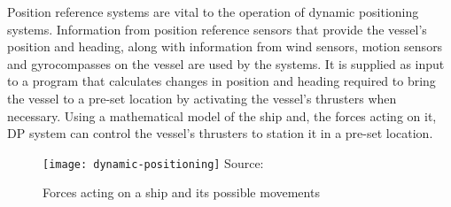

Position reference systems are vital to the operation of dynamic positioning systems. Information from position reference sensors that provide the vessel’s position and heading, along with information from wind sensors, motion sensors and gyrocompasses on the vessel are used by the systems. It is supplied as input to a program that calculates changes in position and heading required to bring the vessel to a pre-set location by activating the vessel’s thrusters when necessary. Using a mathematical model of the ship and, the forces acting on it, DP system can control the vessel's thrusters to station it in a pre-set location.

%
%

\begin{figure}
	\centering
	\caption{Forces acting on a ship and its possible movements}
	\texttt{[image: dynamic-positioning]}
	\hbox{\small Source: }
	\label{fig:shipforces}
\end{figure}

